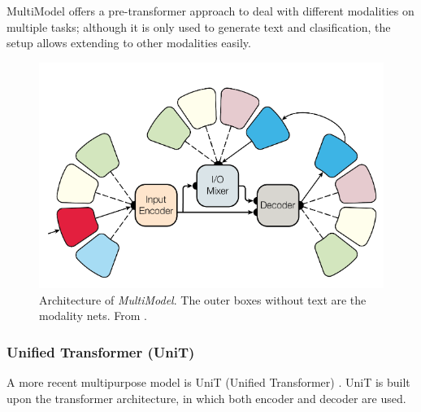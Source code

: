 \documentclass[
]{krantz}
\begin{document}
MultiModel offers a pre-transformer approach to deal with different modalities on multiple tasks; although it is only used to generate text and clasification, the setup allows extending to
other modalities easily.

\begin{figure}

{\centering \includegraphics[width=0.8\linewidth]{figures/03-03-multipurpose/multimodel} 

}

\caption{Architecture of \emph{MultiModel}. The outer boxes without text are the modality nets. From \citet{Kaiser2017}.}\label{fig:multimodel}
\end{figure}



\hypertarget{unified-transformer-unit}{%
\subsubsection{Unified Transformer (UniT)}\label{unified-transformer-unit}}

A more recent multipurpose model is UniT (Unified Transformer) \citep{Hu2021}. UniT is built upon the transformer architecture, in which both encoder and decoder are used.
\end{document}
